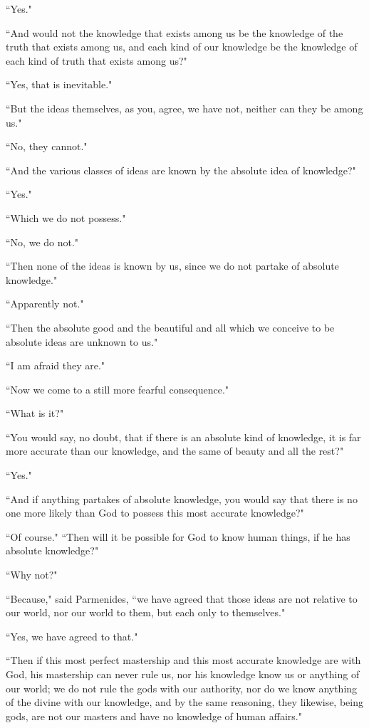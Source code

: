 \documentclass[letterpaper,12pt]{article}
\newcommand{\stephpag}[1]{\marginnote{\small\itshape\fontfamily{ppl}\selectfont #1}}
\begin{document}
``Yes."

``And would not the knowledge that exists among us be the knowledge of the truth that exists among us, and each kind of our knowledge \stephpag{b} be the knowledge of each kind of truth that exists among us?"

``Yes, that is inevitable."

``But the ideas themselves, as you, agree, we have not, neither can they be among us."

``No, they cannot."

``And the various classes of ideas are known by the absolute idea of knowledge?"

``Yes."

``Which we do not possess."

``No, we do not."

``Then none of the ideas is known by us, since we do not partake of absolute knowledge."

``Apparently not."

``Then the absolute good and the beautiful and all \stephpag{c} which we conceive to be absolute ideas are unknown to us."

``I am afraid they are."

``Now we come to a still more fearful consequence."

``What is it?"

``You would say, no doubt, that if there is an absolute kind of knowledge, it is far more accurate than our knowledge, and the same of beauty and all the rest?"

``Yes."

``And if anything partakes of absolute knowledge, you would say that there is no one more likely than God to possess this most accurate knowledge?"

``Of course." \stephpag{d} ``Then will it be possible for God to know human things, if he has absolute knowledge?"

``Why not?"

``Because," said Parmenides, ``we have agreed that those ideas are not relative to our world, nor our world to them, but each only to themselves."

``Yes, we have agreed to that."

``Then if this most perfect mastership and this most accurate knowledge are with God, his mastership can never rule us, \stephpag{e} nor his knowledge know us or anything of our world; we do not rule the gods with our authority, nor do we know anything of the divine with our knowledge, and by the same reasoning, they likewise, being gods, are not our masters and have no knowledge of human affairs."
\end{document}
